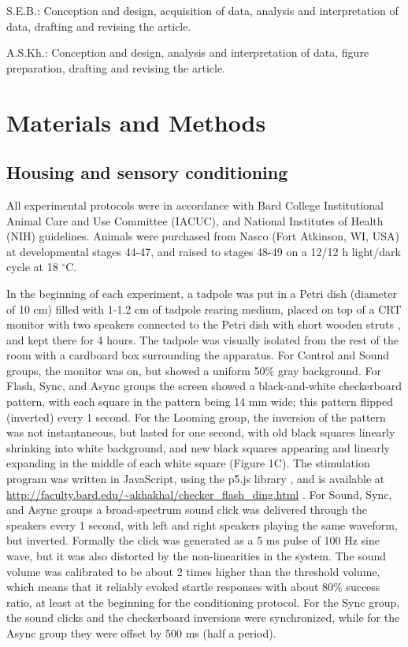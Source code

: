\documentclass{article}
\begin{document}
S.E.B.: Conception and design, acquisition of data, analysis and interpretation of data, drafting and revising the article. 

A.S.Kh.: Conception and design, analysis and interpretation of data, figure preparation, drafting and revising the article.

\section*{Materials and Methods}

\subsection*{Housing and sensory conditioning}

All experimental protocols were in accordance with Bard College Institutional Animal Care and Use Committee (IACUC), and National Institutes of Health (NIH) guidelines. Animals were purchased from Nasco (Fort Atkinson, WI, USA) at developmental stages 44-47, and raised to stages 48-49 on a 12/12 h light/dark cycle at 18 $^{\circ}$C. 

In the beginning of each experiment, a tadpole was put in a Petri dish (diameter of 10 cm) filled with 1-1.2 cm of tadpole rearing medium, placed on top of a CRT monitor with two speakers connected to the Petri dish with short wooden struts \citep{james2015,truszkowski2017}, and kept there for 4 hours. The tadpole was visually isolated from the rest of the room with a cardboard box surrounding the apparatus. For Control and Sound groups, the monitor was on, but showed a uniform 50\% gray background. For Flash, Sync, and Async groups the screen showed a black-and-white checkerboard pattern, with each square in the pattern being 14 mm wide; this pattern flipped (inverted) every 1 second. For the Looming group, the inversion of the pattern was not instantaneous, but lasted for one second, with old black squares linearly shrinking into white background, and new black squares appearing and linearly expanding in the middle of each white square (Figure 1C). The stimulation program was written in JavaScript, using the p5.js library \citep{mccarthy2015}, and is available at \url{http://faculty.bard.edu/~akhakhal/checker_flash_ding.html} . For Sound, Sync, and Async groups a broad-spectrum sound click was delivered through the speakers every 1 second, with left and right speakers playing the same waveform, but inverted. Formally the click was generated as a 5 ms pulse of 100 Hz sine wave, but it was also distorted by the non-linearities in the system. The sound volume was calibrated to be about 2 times higher than the threshold volume, which means that it reliably evoked startle responses with about 80\% success ratio, at least at the beginning for the conditioning protocol. For the Sync group, the sound clicks and the checkerboard inversions were synchronized, while for the Async group they were offset by 500 ms (half a period).
\end{document}

